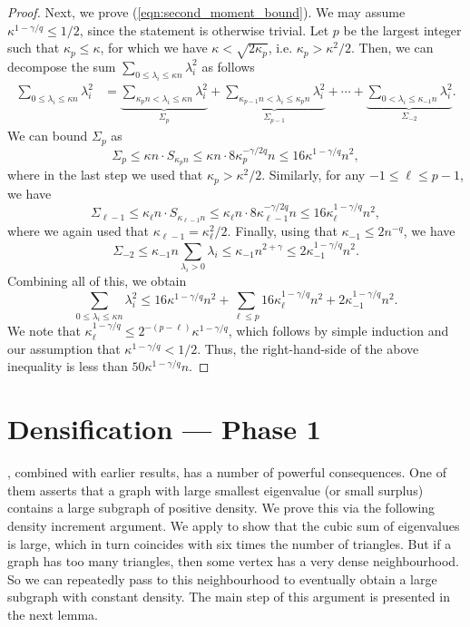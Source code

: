 \documentclass[11pt]{article}
\theoremstyle{plain}
\theoremstyle{definition}
\begin{document}
\begin{proof}
Next, we prove (\ref{eqn:second_moment_bound}). 
We may assume $\kappa^{1-\gamma/q}\leq 1/2$, since the statement is otherwise trivial. 
Let $p$ be the largest integer such that $\kappa_p\leq \kappa$, for which we have $\kappa < \sqrt{2\kappa_p}$, i.e. $\kappa_p> \kappa^2/2$. 
Then, we can decompose the sum $\sum_{0\leq \lambda_i\leq \kappa n}\lambda_i^2$ as follows
\begin{align*}
    \sum_{0\leq \lambda_i\leq \kappa n}\lambda_i^2
    &=\underbrace{\sum_{\kappa_p n< \lambda_i\leq \kappa n}\lambda_i^2}_{\Sigma_p}
        +\underbrace{\sum_{\kappa_{p-1}n< \lambda_i\leq \kappa_p n}\lambda_i^2}_{\Sigma_{p-1}}
        +\cdots+
        \underbrace{\sum_{0< \lambda_i\leq \kappa_{-1} n}\lambda_i^2}_{\Sigma_{-2}}.
\end{align*}
We can bound $\Sigma_p$ as  $$\Sigma_p\leq \kappa n\cdot S_{\kappa_p n}\leq \kappa n\cdot 8\kappa_p^{-\gamma/2q}n\leq 16\kappa^{1-\gamma/q} n^2,$$ where in the last step we used that $\kappa_p> \kappa^2/2$. 
Similarly, for any $-1\leq \ell\leq p-1$, we have $$\Sigma_{\ell-1}\leq \kappa_{\ell}n\cdot S_{\kappa_{\ell-1}n}\leq \kappa_{\ell}n\cdot 8\kappa_{\ell-1}^{-\gamma/2q}n\leq 16\kappa_{\ell}^{1-\gamma/q}n^2,$$ where we again used that $\kappa_{\ell-1}=\kappa_{\ell}^2/2$. 
Finally, using that $\kappa_{-1}\le 2n^{-q}$, we have
$$\Sigma_{-2}\leq \kappa_{-1}n\sum_{\lambda_i>0}\lambda_i\leq \kappa_{-1}n^{2+\gamma}\leq 2\kappa_{-1}^{1-\gamma/q} n^{2}.$$
Combining all of this, we obtain
\[\sum_{0\leq \lambda_i\leq \kappa n}\lambda_i^2\leq 16\kappa^{1-\gamma/q}n^2+\sum_{\ell\leq p}16\kappa_{\ell}^{1-\gamma/q}n^2+2\kappa_{-1}^{1-\gamma/q}n^2.\]
We note that $\kappa_{\ell}^{1-\gamma/q}\leq 2^{-(p-\ell)}\kappa^{1-\gamma/q}$, which follows by simple induction and our assumption that $\kappa^{1-\gamma/q}<1/2$. 
Thus, the right-hand-side of the above inequality is less than $50\kappa^{1-\gamma/q}n$.
\end{proof}

\section{Densification --- Phase 1}\label{sect:dens1}

, combined with earlier results, has a number of powerful consequences.
One of them asserts that a graph with large smallest eigenvalue (or small surplus) contains a large subgraph of positive density.
We prove this via the following density increment argument.
We apply  to show that the cubic sum of eigenvalues is large, which in turn coincides with six times the number of triangles.
But if a graph has too many triangles, then some vertex has a very dense neighbourhood.
So we can repeatedly pass to this neighbourhood to eventually obtain a large subgraph with constant density.
The main step of this argument is presented in the next lemma.
\end{document}
